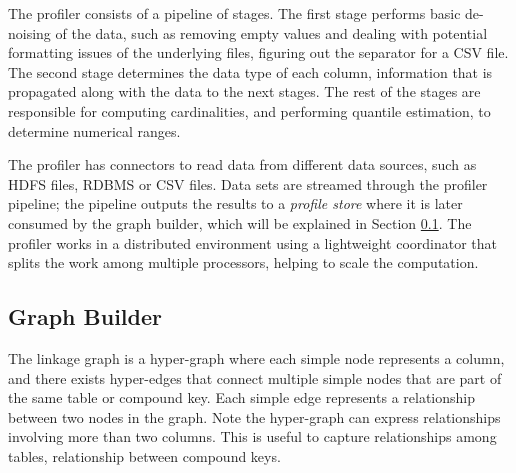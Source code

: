 The profiler consists of a pipeline of stages. The first stage
performs basic de-noising of the data, such as removing empty values and dealing
with potential formatting issues of the underlying files, \eg figuring out the
separator for a CSV file.  The second stage determines the data type of each
column, information that is propagated along with the data to the next stages.
The rest of the stages are responsible for computing cardinalities, and performing
quantile estimation, \eg to determine numerical ranges.

The profiler has connectors to read data from different data sources, such as
HDFS files, RDBMS or CSV files. Data sets are streamed through the profiler
pipeline;  the pipeline outputs the results
to a {\it profile store} where it is later consumed by the graph builder, which
will be explained in Section \ref{subsec:graphbuild}.
The profiler works in a distributed environment using a lightweight coordinator
that splits the work among multiple processors, helping to scale the
computation.



\subsection{Graph Builder}
\label{subsec:graphbuild}

The linkage graph is a hyper-graph where each simple node represents a column,
and there exists hyper-edges that connect multiple simple nodes that are part of
the same table or compound key. Each simple edge represents a relationship
between two nodes in the graph. Note the hyper-graph can express relationships
involving more than two columns. This is useful to capture relationships among
tables, \eg \pkfk relationship between compound keys.


